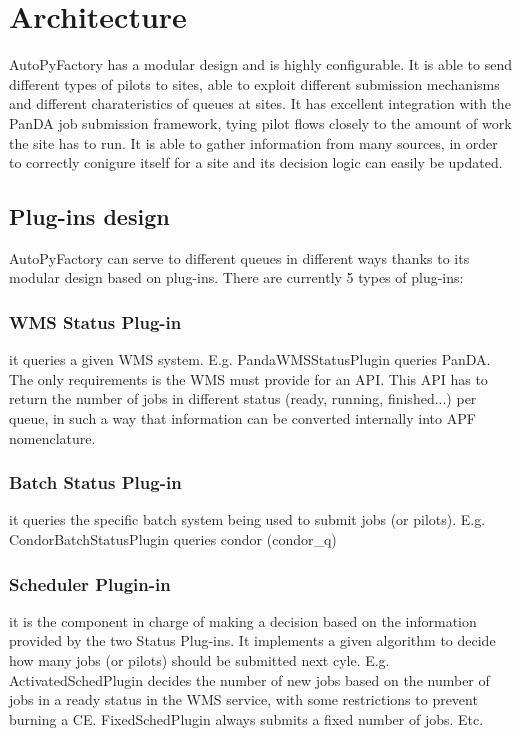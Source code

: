 \documentclass[a4paper]{jpconf}
\begin{document}
\subsection{}

\section{Architecture}


AutoPyFactory has a modular design and is highly configurable. 
It is able to send different types of pilots to sites, 
able to exploit different submission mechanisms and different charateristics of queues at sites. 
It has excellent integration with the PanDA job submission framework, 
tying pilot flows closely to the amount of work the site has to run. 
It is able to gather information from many sources, 
in order to correctly conigure itself for a site and its decision logic can easily be updated.

\subsection{Plug-ins design}

AutoPyFactory can serve to different queues in different ways 
thanks to its modular design based on plug-ins. 
There are currently 5 types of plug-ins:

\subsubsection{WMS Status Plug-in} 
it queries a given WMS system. E.g. PandaWMSStatusPlugin queries PanDA. 
The only requirements is the WMS must provide for an API. 
This API has to return the number of jobs in different status (ready, running, finished...) per queue, 
in such a way that information can be converted internally into APF nomenclature. 

\subsubsection{Batch Status Plug-in} 
it queries the specific batch system being used to submit jobs (or pilots). 
E.g. CondorBatchStatusPlugin queries condor (condor_q)

\subsubsection{Scheduler Plugin-in} 
it is the component in charge of making a decision based on the information provided by the two Status Plug-ins. 
It implements a given algorithm to decide how many jobs (or pilots) should be submitted next cyle. 
E.g. ActivatedSchedPlugin decides the number of new jobs based on the number of jobs in a ready status in the WMS service, 
with some restrictions to prevent burning a CE. 
FixedSchedPlugin always submits a fixed number of jobs. Etc.
\end{document}
